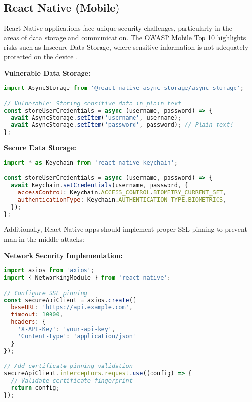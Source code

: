 \documentclass[conference]{IEEEtran}
\begin{document}
\subsection{React Native (Mobile)}
React Native applications face unique security challenges, particularly in the areas of data storage and communication. The OWASP Mobile Top 10 highlights risks such as Insecure Data Storage, where sensitive information is not adequately protected on the device \cite{owaspMobile}.

\textbf{Vulnerable Data Storage:}

\begin{lstlisting}[language=JavaScript, caption=Insecure data storage in React Native]
import AsyncStorage from '@react-native-async-storage/async-storage';

// Vulnerable: Storing sensitive data in plain text
const storeUserCredentials = async (username, password) => {
  await AsyncStorage.setItem('username', username);
  await AsyncStorage.setItem('password', password); // Plain text!
};
\end{lstlisting}

\textbf{Secure Data Storage:}

\begin{lstlisting}[language=JavaScript, caption=Secure data storage using Keychain]
import * as Keychain from 'react-native-keychain';

const storeUserCredentials = async (username, password) => {
  await Keychain.setCredentials(username, password, {
    accessControl: Keychain.ACCESS_CONTROL.BIOMETRY_CURRENT_SET,
    authenticationType: Keychain.AUTHENTICATION_TYPE.BIOMETRICS,
  });
};
\end{lstlisting}

Additionally, React Native apps should implement proper SSL pinning to prevent man-in-the-middle attacks:

\textbf{Network Security Implementation:}

\begin{lstlisting}[language=JavaScript, caption=Secure network communication with SSL pinning]
import axios from 'axios';
import { NetworkingModule } from 'react-native';

// Configure SSL pinning
const secureApiClient = axios.create({
  baseURL: 'https://api.example.com',
  timeout: 10000,
  headers: {
    'X-API-Key': 'your-api-key',
    'Content-Type': 'application/json'
  }
});

// Add certificate pinning validation
secureApiClient.interceptors.request.use((config) => {
  // Validate certificate fingerprint
  return config;
});
\end{lstlisting}
\end{document}
